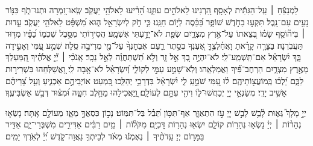 {	
	\begin{narrow}
		לַמְנַצֵּ֬חַ ׀ עַֽל־הַגִּתִּ֬ית לְאָסָֽף׃
		הַ֭רְנִינוּ לֵאלֹהִ֣ים עוּזֵּ֑נוּ הָ֝רִ֗יעוּ לֵאלֹהֵ֥י יַעֲקֹֽב׃
		שְֽׂאוּ־זִ֭מְרָה וּתְנוּ־תֹ֑ף כִּנּ֖וֹר נָעִ֣ים עִם־נָֽבֶל׃
		תִּקְע֣וּ בַחֹ֣דֶשׁ שׁוֹפָ֑ר בַּ֝כֵּ֗סֶה לְי֣וֹם חַגֵּֽנוּ׃
		כִּ֤י חֹ֣ק לְיִשְׂרָאֵ֣ל ה֑וּא מִ֝שְׁפָּ֗ט לֵאלֹהֵ֥י יַעֲקֹֽב׃
		עֵ֤דוּת ׀ בִּיה֘וֹסֵ֤ף שָׂמ֗וֹ בְּ֭צֵאתוֹ עַל־אֶ֣רֶץ מִצְרָ֑יִם שְׂפַ֖ת לֹא־יָדַ֣עְתִּי אֶשְׁמָֽע׃
		הֲסִיר֣וֹתִי מִסֵּ֣בֶל שִׁכְמ֑וֹ כַּ֝פָּ֗יו מִדּ֥וּד תַּעֲבֹֽרְנָה׃
		בַּצָּרָ֥ה קָרָ֗אתָ וָאֲחַ֫לְּצֶ֥ךָּ אֶ֭עֶנְךָ בְּסֵ֣תֶר רַ֑עַם אֶבְחׇנְךָ֨ עַל־מֵ֖י מְרִיבָ֣ה סֶֽלָה׃
		שְׁמַ֣ע עַ֭מִּי וְאָעִ֣ידָה בָּ֑ךְ יִ֝שְׂרָאֵ֗ל אִם־תִּֽשְׁמַֽע־לִֽי׃
		לֹא־יִהְיֶ֣ה בְ֭ךָ אֵ֣ל זָ֑ר וְלֹ֥א תִ֝שְׁתַּחֲוֶ֗ה לְאֵ֣ל נֵכָֽר׃
		אָֽנֹכִ֨י ׀ יְ֘יָ֤ אֱלֹהֶ֗יךָ הַֽ֭מַּעַלְךָ מֵאֶ֣רֶץ מִצְרָ֑יִם הַרְחֶב־פִּ֗֝יךָ וַאֲמַלְאֵֽהוּ׃
		וְלֹֽא־שָׁמַ֣ע עַמִּ֣י לְקוֹלִ֑י וְ֝יִשְׂרָאֵ֗ל לֹא־אָ֥בָה לִֽי׃
		וָ֭אֲשַׁלְּחֵהוּ בִּשְׁרִיר֣וּת לִבָּ֑ם יֵ֝לְכ֗וּ בְּֽמוֹעֲצ֖וֹתֵיהֶֽם׃
		ל֗וּ עַ֭מִּי שֹׁמֵ֣עַֽ לִ֑י יִ֝שְׂרָאֵ֗ל בִּדְרָכַ֥י יְהַלֵּֽכוּ׃
		כִּ֭מְעַט אוֹיְבֵיהֶ֣ם אַכְנִ֑יעַ וְעַ֥ל צָ֝רֵיהֶ֗ם אָשִׁ֥יב יָדִֽי׃
		מְשַׂנְאֵ֣י יְיָ֭ יְכַחֲשׁוּ־ל֑וֹ וִיהִ֖י עִתָּ֣ם לְעוֹלָֽם׃
		וַֽ֭יַּאֲכִילֵהוּ מֵחֵ֣לֶב חִטָּ֑ה וּ֝מִצּ֗וּר דְּבַ֣שׁ אַשְׂבִּיעֶֽךָ׃
	\end{narrow}
	
	\shirshelyomintro{שִּׁשִּׁי בַּשַּׁבָּת}
	\begin{narrow}
		\source{תהלים צג}%
		יְיָ֣ מָלָךְ֮ גֵּא֢וּת לָ֫בֵ֥שׁ לָבֵ֣שׁ יְיָ֭ עֹ֣ז הִתְאַזָּ֑ר אַף־תִּכּ֥וֹן תֵּ֝בֵ֗ל בַּל־תִּמּֽוֹט׃
		נָכ֣וֹן כִּסְאֲךָ֣ מֵאָ֑ז מֵעוֹלָ֣ם אָֽתָּה׃
		נָשְׂא֤וּ נְהָר֨וֹת ׀ יְיָ֗ נָשְׂא֣וּ נְהָר֣וֹת קוֹלָ֑ם יִשְׂא֖וּ נְהָר֣וֹת דׇּכְיָֽם׃
		מִקֹּל֨וֹת ׀ מַ֤יִם רַבִּ֗ים אַדִּירִ֣ים מִשְׁבְּרֵי־יָ֑ם אַדִּ֖יר בַּמָּר֣וֹם יְיָ׃
		עֵֽדֹתֶ֨יךָ ׀ נֶאֶמְנ֬וּ מְאֹ֗ד לְבֵיתְךָ֥ נַאֲוָה־קֹ֑דֶשׁ יְ֝יָ֗ לְאֹ֣רֶךְ יָמִֽים׃
	\end{narrow}
}

